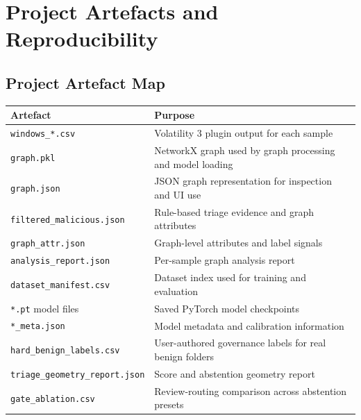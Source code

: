 \appendix
\chapter{Project Artefacts and Reproducibility}
\label{app:repro}

\section{Project Artefact Map}
\begin{longtable}{p{}p{}}
\toprule
\textbf{Artefact} & \textbf{Purpose} \\
\midrule
\endhead
\texttt{windows\_*.csv} & Volatility 3 plugin output for each sample \\
\texttt{graph.pkl} & NetworkX graph used by graph processing and model loading \\
\texttt{graph.json} & JSON graph representation for inspection and UI use \\
\texttt{filtered\_malicious.json} & Rule-based triage evidence and graph attributes \\
\texttt{graph\_attr.json} & Graph-level attributes and label signals \\
\texttt{analysis\_report.json} & Per-sample graph analysis report \\
\texttt{dataset\_manifest.csv} & Dataset index used for training and evaluation \\
\texttt{*.pt} model files & Saved PyTorch model checkpoints \\
\texttt{*\_meta.json} & Model metadata and calibration information \\
\texttt{hard\_benign\_labels.csv} & User-authored governance labels for real benign folders \\
\texttt{triage\_geometry\_report.json} & Score and abstention geometry report \\
\texttt{gate\_ablation.csv} & Review-routing comparison across abstention presets \\
\bottomrule
\end{longtable}

